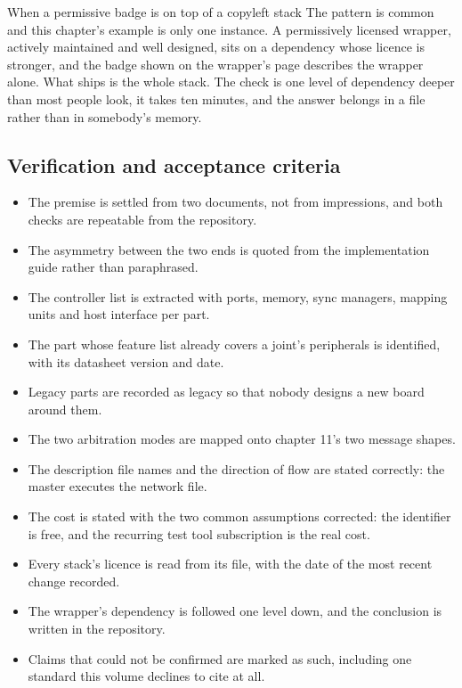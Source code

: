 \begin{note}{When a permissive badge is on top of a copyleft stack}
The pattern is common and this chapter's example is only one instance. A
permissively licensed wrapper, actively maintained and well designed, sits on a
dependency whose licence is stronger, and the badge shown on the wrapper's page
describes the wrapper alone. What ships is the whole stack. The check is one
level of dependency deeper than most people look, it takes ten minutes, and the
answer belongs in a file rather than in somebody's memory.
\end{note}

\subsection*{Verification and acceptance criteria}

\begin{itemize}
\item The premise is settled from two documents, not from impressions, and both
checks are repeatable from the repository.
\item The asymmetry between the two ends is quoted from the implementation guide
rather than paraphrased.
\item The controller list is extracted with ports, memory, sync managers,
mapping units and host interface per part.
\item The part whose feature list already covers a joint's peripherals is
identified, with its datasheet version and date.
\item Legacy parts are recorded as legacy so that nobody designs a new board
around them.
\item The two arbitration modes are mapped onto chapter 11's two message shapes.
\item The description file names and the direction of flow are stated correctly:
the master executes the network file.
\item The cost is stated with the two common assumptions corrected: the
identifier is free, and the recurring test tool subscription is the real cost.
\item Every stack's licence is read from its file, with the date of the most
recent change recorded.
\item The wrapper's dependency is followed one level down, and the conclusion is
written in the repository.
\item Claims that could not be confirmed are marked as such, including one
standard this volume declines to cite at all.
\end{itemize}

